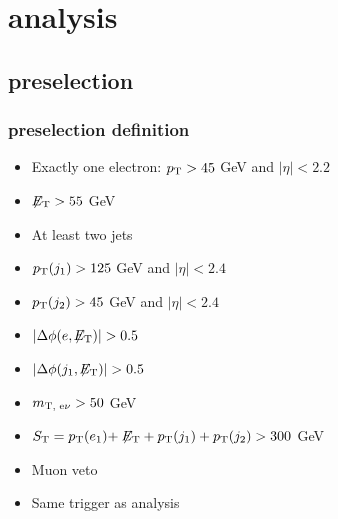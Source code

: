 \documentclass[bigger]{beamer}
\begin{document}
\section{\enujj analysis}
\label{sec-3}
\subsection{\enujj preselection}
\label{sec-3-1}
\begin{frame}
\frametitle{\enujj preselection definition}
\label{sec-3-1-1}
\label{sec-3-1-1-1}

\begin{itemize}
\item Exactly one electron: $p_{\text{T}} > 45$ GeV and  $|\eta| < 2.2$
\item $\not\!\!{E_{\text{T}}} > 55$ GeV
\item At least two jets
\item $p_{\text{T}}(j_1) > 125$ GeV and $|\eta| < 2.4$
\item $p_{\text{T}}(j_2) > 45$  GeV and $|\eta| < 2.4$
\item $|\Delta\phi(e, \not\!\!{E_{\text{T}}})| > 0.5$
\item $|\Delta\phi(j_1, \not\!\!{E_{\text{T}}})| > 0.5$
\item $m_{\text{T, e}\nu} > 50$ GeV
\item $S_{\text{T}} = p_{\text{T}}(e_1) + \not\!\!{E_{\text{T}}} + p_{\text{T}}(j_1) + p_{\text{T}}(j_2) > 300$ GeV
\item Muon veto
\item Same trigger as \eejj analysis
\end{itemize}
\end{frame}
\end{document}
